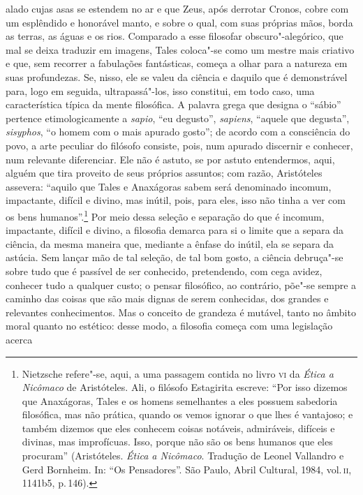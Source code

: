 alado cujas asas se estendem no ar e que Zeus, após derrotar Cronos, cobre
com um esplêndido e honorável manto, e sobre o qual, com suas próprias mãos,
borda as terras, as águas e os rios. Comparado a esse filosofar
obscuro"-alegórico, que mal se deixa traduzir em imagens, Tales coloca"-se
como um mestre mais criativo e que, sem recorrer a fabulações fantásticas,
começa a olhar para a natureza em suas profundezas. Se, nisso, ele se valeu
da ciência e daquilo que é demonstrável para, logo em seguida,
ultrapassá"-los, isso constitui, em todo caso, uma característica típica da
mente filosófica. A palavra grega que designa o ``sábio'' pertence
etimologicamente a \textit{sapio}, ``eu degusto'', \textit{sapiens}, ``aquele
que degusta'', \textit{sisyphos}, ``o homem com o mais apurado gosto''; de acordo com a
 consciência do povo, a arte peculiar do filósofo consiste, pois, num apurado
 discernir e conhecer, num relevante diferenciar. Ele não é astuto, se por
 astuto entendermos, aqui, alguém que tira proveito de seus próprios
 assuntos; com razão, Aristóteles assevera: ``aquilo que Tales e Anaxágoras
 sabem será denominado incomum, impactante, difícil e divino, mas inútil,
 pois, para eles, isso não tinha a ver com os bens humanos''.\footnote{Nietzsche 
 refere"-se, aqui, a uma passagem contida no livro \textsc{vi} da 
 \textit{Ética a Nicômaco} de Aristóteles. Ali, o filósofo Estagirita
 escreve: ``Por isso dizemos que Anaxágoras, Tales e os homens semelhantes a
 eles possuem sabedoria filosófica, mas não prática, quando os vemos ignorar
 o que lhes é vantajoso; e também dizemos que eles conhecem coisas notáveis,
 admiráveis, difíceis e divinas, mas improfícuas. Isso, porque não são os
 bens humanos que eles procuram'' (Aristóteles. \textit{Ética a Nicômaco}.
 Tradução de Leonel Vallandro e Gerd Bornheim. In: ``Os Pensadores''. São
 Paulo, Abril Cultural, 1984, vol.\,\textsc{ii}, 1141b5, p.\,146).} Por meio
 dessa seleção e separação do que é incomum, impactante, difícil e divino, a
 filosofia demarca para si o limite que a separa da ciência, da mesma maneira
 que, mediante a ênfase do inútil, ela se separa da astúcia. Sem lançar mão
 de tal seleção, de tal bom gosto, a ciência debruça"-se sobre tudo que é
 passível de ser conhecido, pretendendo, com cega avidez, conhecer tudo a
 qualquer custo; o pensar filosófico, ao contrário, põe"-se sempre a caminho
 das coisas que são mais dignas de serem conhecidas, dos grandes e relevantes
 conhecimentos. Mas o conceito de grandeza é mutável, tanto no âmbito moral
 quanto no estético: desse modo, a filosofia começa com uma legislação acerca
